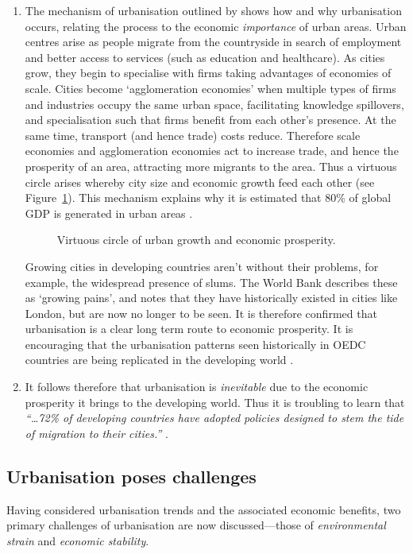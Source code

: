 \begin{enumerate}
	\item The mechanism of urbanisation outlined by \citet{WorldBank2008a} shows how and why urbanisation occurs, relating the process to the economic \emph{importance} of urban areas. Urban centres arise as people migrate from the countryside in search of employment and better access to services (such as education and healthcare). As cities grow, they begin to specialise with firms taking advantages of economies of scale. Cities become `agglomeration economies' when multiple types of firms and industries occupy the same urban space, facilitating knowledge spillovers, and specialisation such that firms benefit from each other's presence. At the same time, transport (and hence trade) costs reduce. Therefore scale economies and agglomeration economies act to increase trade, and hence the prosperity of an area, attracting more migrants to the area. Thus a virtuous circle arises whereby city size and economic growth feed each other (see Figure~\ref{fig:urbanCycle}). This mechanism explains why it is estimated that 80\% of global GDP is generated in urban areas \citep{AREAS2012}.

\begin{figure}[h]
	\centering
	
	\caption{Virtuous circle of urban growth and economic prosperity.} \label{fig:urbanCycle}
\end{figure}
Growing cities in developing countries aren't without their problems, for example, the widespread presence of slums. The World Bank describes these as `growing pains', and notes that they have historically existed in cities like London, but are now no longer to be seen. It is therefore confirmed that urbanisation is a clear long term route to economic prosperity. It is encouraging that the urbanisation patterns seen historically in OEDC countries are being replicated in the developing world \citep{WorldBank2008a}. 

	\item It follows therefore that urbanisation is \emph{inevitable} due to the economic prosperity it brings to the developing world. Thus it is troubling to learn that \emph{``\ldots 72\% of developing countries have adopted policies designed to stem the tide of migration to their cities.''} \citep{Donald2012}.
\end{enumerate}


\subsection{Urbanisation poses challenges} \label{sec:urban_challenges}
Having considered urbanisation trends and the associated economic benefits, two primary challenges of urbanisation are now discussed---those of \emph{environmental strain} and \emph{economic stability}.

